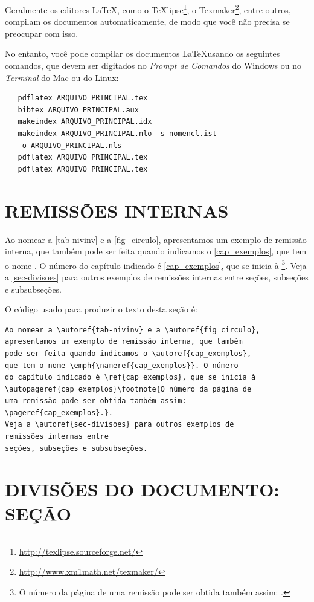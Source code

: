 Geralmente os editores \LaTeX, como o
TeXlipse\footnote{\url{http://texlipse.sourceforge.net/}}, o
Texmaker\footnote{\url{http://www.xm1math.net/texmaker/}}, entre outros,
compilam os documentos automaticamente, de modo que você não precisa se
preocupar com isso.

No entanto, você pode compilar os documentos \LaTeX usando os seguintes
comandos, que devem ser digitados no \emph{Prompt de Comandos} do Windows ou no
\emph{Terminal} do Mac ou do Linux:

\begin{verbatim}
   pdflatex ARQUIVO_PRINCIPAL.tex
   bibtex ARQUIVO_PRINCIPAL.aux
   makeindex ARQUIVO_PRINCIPAL.idx 
   makeindex ARQUIVO_PRINCIPAL.nlo -s nomencl.ist 
   -o ARQUIVO_PRINCIPAL.nls
   pdflatex ARQUIVO_PRINCIPAL.tex
   pdflatex ARQUIVO_PRINCIPAL.tex
\end{verbatim}

\section{\uppercase{Remissões internas}}

Ao nomear a \autoref{tab-nivinv} e a \autoref{fig_circulo}, apresentamos um
exemplo de remissão interna, que também pode ser feita quando indicamos o
\autoref{cap_exemplos}, que tem o nome \emph{}. O número
do capítulo indicado é \ref{cap_exemplos}, que se inicia à
\footnote{O número da página de uma remissão pode ser
obtida também assim:
\pageref{cap_exemplos}.}.
Veja a \autoref{sec-divisoes} para outros exemplos de remissões internas entre
seções, subseções e subsubseções.

O código usado para produzir o texto desta seção é:

\begin{verbatim}
Ao nomear a \autoref{tab-nivinv} e a \autoref{fig_circulo}, 
apresentamos um exemplo de remissão interna, que também 
pode ser feita quando indicamos o \autoref{cap_exemplos},
que tem o nome \emph{\nameref{cap_exemplos}}. O número
do capítulo indicado é \ref{cap_exemplos}, que se inicia à
\autopageref{cap_exemplos}\footnote{O número da página de 
uma remissão pode ser obtida também assim:
\pageref{cap_exemplos}.}.
Veja a \autoref{sec-divisoes} para outros exemplos de 
remissões internas entre
seções, subseções e subsubseções.
\end{verbatim}

\section{\uppercase{Divisões do documento: seção}}\label{sec-divisoes}

